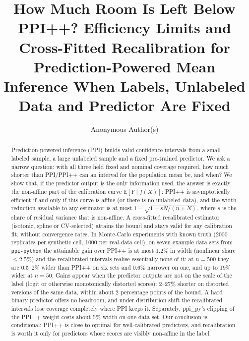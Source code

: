 \documentclass{article}
\title{How Much Room Is Left Below PPI++? Efficiency Limits and Cross-Fitted Recalibration for Prediction-Powered Mean Inference When Labels, Unlabeled Data and Predictor Are Fixed}
\author{Anonymous Author(s)}
\theoremstyle{remark}\newtheorem{remark}{Remark}
\begin{document}
\maketitle

\begin{abstract}
Prediction-powered inference (PPI) builds valid confidence intervals from a small labeled sample, a large unlabeled sample and a fixed pre-trained predictor. We ask a narrow question: with all three held fixed and nominal coverage required, how much shorter than PPI/PPI++ can an interval for the population mean be, and when? We show that, if the predictor output is the only information used, the answer is exactly the non-affine part of the calibration curve $\mathbb E[Y\mid f(X)]$: PPI++ is asymptotically efficient if and only if this curve is affine (or there is no unlabeled data), and the width reduction available to any estimator is at most $1-\sqrt{1-sN/(n+N)}$, where $s$ is the share of residual variance that is non-affine. A cross-fitted recalibrated estimator (isotonic, spline or CV-selected) attains the bound and stays valid for any calibration fit, without convergence rates. In Monte-Carlo experiments with known truth (2000 replicates per synthetic cell, 1000 per real-data cell), on seven example data sets from \texttt{ppi-python} the attainable gain over PPI++ is at most 1.2\% in width (nonlinear share $\le 2.5\%$) and the recalibrated intervals realise essentially none of it: at $n=500$ they are 0.5--2\% wider than PPI++ on six sets and 0.6\% narrower on one, and up to 19\% wider at $n=50$. Gains appear when the predictor outputs are not on the scale of the label (logit or otherwise monotonically distorted scores): 2--27\% shorter on distorted versions of the same data, within about 2 percentage points of the bound. A hard binary predictor offers no headroom, and under distribution shift the recalibrated intervals lose coverage completely where PPI keeps it. Separately, ppi\_py's clipping of the PPI++ weight costs about 5\% width on one data set. Our conclusion is conditional: PPI++ is close to optimal for well-calibrated predictors, and recalibration is worth it only for predictors whose scores are visibly non-affine in the label.
\end{abstract}
\end{document}
